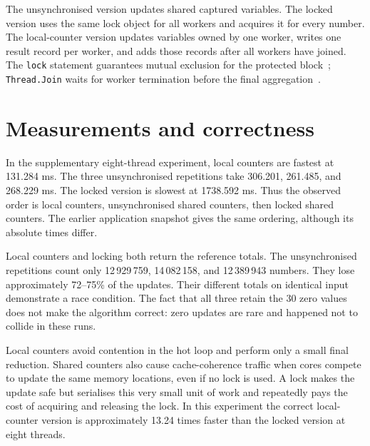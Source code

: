 

The unsynchronised version updates shared captured variables. The locked version uses the same lock object for all workers and acquires it for every number. The local-counter version updates variables owned by one worker, writes one result record per worker, and adds those records after all workers have joined. The \texttt{lock} statement guarantees mutual exclusion for the protected block~\cite{lock}; \texttt{Thread.Join} waits for worker termination before the final aggregation~\cite{join}.

\section{Measurements and correctness}


In the supplementary eight-thread experiment, local counters are fastest at 131.284 ms. The three unsynchronised repetitions take 306.201, 261.485, and 268.229 ms. The locked version is slowest at 1738.592 ms. Thus the observed order is local counters, unsynchronised shared counters, then locked shared counters. The earlier application snapshot gives the same ordering, although its absolute times differ.

Local counters and locking both return the reference totals. The unsynchronised repetitions count only 12\,929\,759, 14\,082\,158, and 12\,389\,943 numbers. They lose approximately 72--75\% of the updates. Their different totals on identical input demonstrate a race condition. The fact that all three retain the 30 zero values does not make the algorithm correct: zero updates are rare and happened not to collide in these runs.

Local counters avoid contention in the hot loop and perform only a small final reduction. Shared counters also cause cache-coherence traffic when cores compete to update the same memory locations, even if no lock is used. A lock makes the update safe but serialises this very small unit of work and repeatedly pays the cost of acquiring and releasing the lock. In this experiment the correct local-counter version is approximately 13.24 times faster than the locked version at eight threads.

